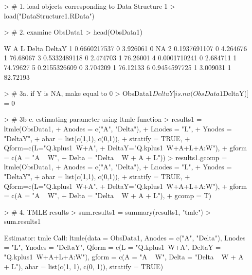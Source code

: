 \documentclass[answers]{exam}
\begin{document}
\begin{solution}
\begin{Schunk}
\begin{Sinput}
> # 1. load objects corresponding to Data Structure 1
> load("DataStructure1.RData")
\end{Sinput}
\end{Schunk}
\begin{Schunk}
\begin{Sinput}
> # 2. examine ObsData1
> head(ObsData1)
\end{Sinput}
\begin{Soutput}
             W A        L Delta   DeltaY
1 0.6660217537 0 3.926061     0       NA
2 0.1937691107 0 4.264676     1 76.68067
3 0.5332489118 0 2.474703     1 76.26001
4 0.0001710241 0 2.684711     1 74.79627
5 0.2155326609 0 3.704209     1 76.12133
6 0.9454597725 1 3.009031     1 82.72193
\end{Soutput}
\end{Schunk}
\begin{Schunk}
\begin{Sinput}
> # 3a. if Y is NA, make equal to 0
> ObsData1$DeltaY[is.na(ObsData1$DeltaY)] = 0
\end{Sinput}
\end{Schunk}
\begin{Schunk}
\begin{Sinput}
> # 3b-e. estimating parameter using ltmle function
> results1 = ltmle(ObsData1, 
+                  Anodes = c("A", "Delta"), 
+                  Lnodes = "L", 
+                  Ynodes = "DeltaY", 
+                  abar = list(c(1,1), c(0,1)), 
+                  stratify = TRUE,
+                  Qform=c(L="Q.kplus1~W+A", 
+                          DeltaY="Q.kplus1~W+A+L+A:W"),
+                  gform = c(A = "A ~ W",
+                            Delta = "Delta ~ W + A + L"))
> results1.gcomp = ltmle(ObsData1, 
+                        Anodes = c("A", "Delta"), 
+                        Lnodes = "L",
+                        Ynodes = "DeltaY", 
+                        abar = list(c(1,1), c(0,1)), 
+                        stratify = TRUE,
+                        Qform=c(L="Q.kplus1~W+A", 
+                                DeltaY="Q.kplus1~W+A+L+A:W"),
+                        gform = c(A = "A ~ W",
+                                  Delta = "Delta ~ W + A + L"),
+                        gcomp = T)
\end{Sinput}
\end{Schunk}
\begin{Schunk}
\begin{Sinput}
> # 4. TMLE results
> sum.results1 = summary(results1, "tmle")
> sum.results1
\end{Sinput}
\begin{Soutput}
Estimator:  tmle 
Call:
ltmle(data = ObsData1, Anodes = c("A", "Delta"), Lnodes = "L", 
    Ynodes = "DeltaY", Qform = c(L = "Q.kplus1~W+A", DeltaY = "Q.kplus1~W+A+L+A:W"), 
    gform = c(A = "A ~ W", Delta = "Delta ~ W + A + L"), abar = list(c(1, 
        1), c(0, 1)), stratify = TRUE)


\end{Soutput}
\end{Schunk}
\end{solution}
\end{document}
